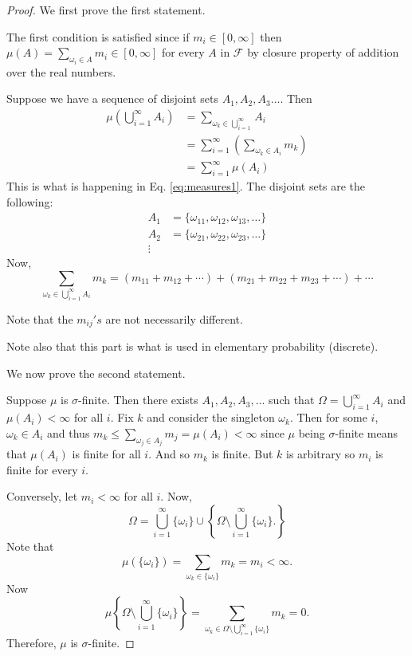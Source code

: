 \begin{proof}
We first prove the first statement.
\begin{prooflist}
\item  The first condition is satisfied since if $m_i\in [0,\infty]$ then $\mu(A)=\sum_{\omega_i\in A}m_i\in[0,\infty]$ for every $A$ in $\mathcal F$ by closure property of addition over the real numbers.

\item Suppose we have a sequence of disjoint sets $A_1, A_2, A_3 \ldots$. Then 
\begin{align}
\mu\left(\bigcup_{i=1}^\infty A_i\right) &= \sum_{\omega_k\in \bigcup_{i=1}^\infty} A_i\\
 &= \sum_{i=1}^{\infty}\left(\sum_{\omega_k\in A_i} m_k\right)\label{eq:measures1}\\
 &= \sum_{i=1}^{\infty} \mu(A_i)
\end{align}
This is what is happening in Eq. \eqref{eq:measures1}. The disjoint sets are the following:
\begin{align*}
A_1&=\{\omega_{11}, \omega_{12}, \omega_{13}, \ldots\}\\
A_2&=\{\omega_{21}, \omega_{22}, \omega_{23}, \ldots \}\\
\vdots
\end{align*}
Now,
\begin{equation*}
\sum_{\omega_k\in\bigcup_{i=1}^\infty A_i} m_k= (m_{11}+m_{12}+\cdots) + (m_{21}+m_{22}+m_{23}+\cdots) + \cdots
\end{equation*}
\end{prooflist}
Note that the $m_{ij}'s$ are not necessarily different.

Note also that this part is what is used in elementary probability (discrete).

We now prove the second statement.

Suppose $\mu$ is $\sigma$-finite. Then there exists $A_1, A_2, A_3, \ldots$ such that $\Omega=\bigcup_{i=1}^\infty A_i$ and $\mu(A_i)<\infty$ for all $i$. Fix $k$ and consider the singleton $\omega_k$. Then for some $i$, $\omega_k\in A_i$ and thus $m_k\leq \sum_{\omega_j\in A_j} m_j=\mu(A_i)<\infty$ since $\mu$ being $\sigma$-finite means that $\mu(A_i)$ is finite for all $i$. And so $m_k$ is finite. But $k$ is arbitrary so $m_i$ is finite for every $i$.

Conversely, let $m_i<\infty$ for all $i$. Now,
\begin{equation*}
\Omega=\bigcup_{i=1}^\infty\{\omega_i\}\cup \left\{\Omega\setminus \bigcup_{i=1}^\infty \{\omega_i \}. \right\}
\end{equation*}
Note that 
\begin{equation*}
\mu(\{\omega_i\})=\sum_{\omega_k\in\{\omega_i\}}m_k=m_i<\infty.
\end{equation*}
Now
\begin{equation*}
\mu\left\{\Omega\setminus \bigcup_{i=1}^\infty\{\omega_i\} \right\} = \sum_{\omega_k\in\Omega\setminus\bigcup_{i=1}^\infty\{\omega_i\}}m_k=0.
\end{equation*}
Therefore, $\mu$ is $\sigma$-finite.
\end{proof}


